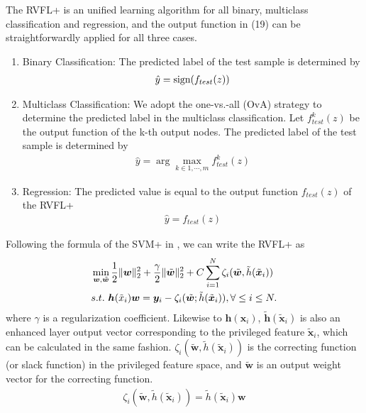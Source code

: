 The RVFL+ is an unified learning algorithm for all binary, multiclass classification and regression, and the output function in (19) can be straightforwardly applied for all three
cases. 
\begin{enumerate}
  \item Binary Classification: The predicted label of the test
sample is determined by
\begin{align}
  \hat y = \textup{sign}(f_{test}(z))
\end{align}
  \item Multiclass Classification: We adopt the one-vs.-all (OvA) strategy to determine the predicted label in the multiclass classification. Let $f_{test}^k (z)$ be the output function of the k-th output nodes. The predicted label of the test sample is determined by
\begin{align}
  \hat y = \arg \max_{ k \in 1,\cdots,m} f_{test}^k (z)
\end{align}
  \item  Regression: The predicted value is equal to the output function $f_{test}(z)$ of the RVFL+
\begin{align}
  \hat y = f_{test}(z)
\end{align}
\end{enumerate}

Following the formula of the SVM+ in \cite{VAPNIK2009544}, we can write the RVFL+ as
\begin{align}
&\min\limits_{{\bm w},\tilde {\bm w}} \frac 1 2 \|{\bm w}\|_2^ 2 + \frac \gamma 2 \|\tilde {\bm w}\|_2^ 2 + C\sum_{i=1}^N \zeta_i (\tilde {\bm w}, {\tilde h}({\tilde {\bm x}}_i))\notag\\
&s.t.\,\, \bm h(\tilde x_i){\bm w} = \bm y_i - \zeta_i (\tilde {\bm w}; {\tilde h}({\tilde {\bm x}}_i)), \forall \leq i \leq  N.\label{RVFL20181102eq8}
\end{align}
where $\gamma$ is a regularization coefficient. Likewise to $\bm h(\bm x_i)$, ${\tilde {\bm h}}({\tilde {\bm x}}_i)$ is also an enhanced layer output vector corresponding to the privileged feature ${\tilde {\bm x}}_i$, which can be calculated in the same fashion. $\zeta_i (\tilde {\bm w}, {\tilde h}({\tilde {\bm x}}_i))$ is the correcting function (or slack function) in the privileged feature space, and $\tilde {\bm w}$ is an output weight vector for the correcting function.
\begin{align}\label{RVFL20181102eq9}
\zeta_i (\tilde {\bm w}, {\tilde h}({\tilde {\bm x}}_i)) = {\tilde h}({\tilde {\bm x}}_i){\bm w}
\end{align}

